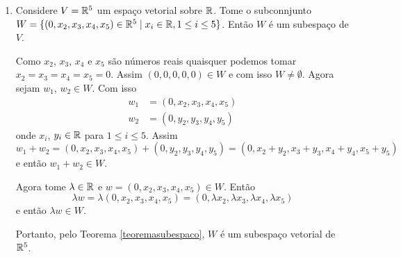\begin{exemplos}
\begin{enumerate}[label={\arabic*})]
\begin{solucao}
			Agora,
			\[
				\lambda u_1 = (\lambda t/4, -13\lambda t/4, \lambda t)
			\]
			e substuindo nas equações de \eqref{exemplosistemahomogeneosubespaco}
			obtemos:
			\begin{align*}
				2\dfrac{\lambda t}{4} + 4\dfrac{-13\lambda t}{8} + 6\lambda t &= \lambda(2\dfrac{t}{8} + 4\dfrac{-13t}{8} + 6t)\\
				3\dfrac{\lambda t}{4} - 2\dfrac{-13\lambda t}{8} - 4\lambda t &= \lambda(3\dfrac{t}{8} - 2\dfrac{-13t}{8} - 4t)\\
				\dfrac{\lambda t}{4} + 2\dfrac{-13\lambda t}{8} + 3\lambda t &= \lambda(\dfrac{t}{8} + 2\dfrac{-13t}{8} + 3t)\\
			\end{align*}
			e como $u_1$ é solução do sistema linear homogêneo \eqref{exemplosistemahomogeneosubespaco} então $\lambda u_1$ é um solução desse sistema, isto é, $\lambda u_1 \in S$. Portanto, pelo Teorema \ref{teoremasubespaco} $S$ é um subespaço vetorial de $\real^3$.
		\end{solucao}
	\item Considere $V = \mathbb{R}^5$ um espaço vetorial sobre $\mathbb{R}$. Tome o subconnjunto $W = \{(0,x_2,x_3,x_4,x_5) \in \mathbb{R}^5 \mid x_i \in \mathbb{R}, 1 \le i \le 5\}$. Então $W$ \'e um subespa\c{c}o de $V$.
		\begin{solucao}
			Como $x_2$, $x_3$, $x_4$ e $x_5$ são números reais quaisquer podemos tomar $x_2 = x_3 = x_4 = x_ 5 = 0$. Assim $(0, 0, 0, 0, 0) \in W$ e com isso $W \ne \emptyset$. Agora sejam $w_1$, $w_2 \in W$. Com isso
			\begin{align*}
				w_1 &= (0,x_2, x_3, x_4, x_5)\\
				w_2 &= (0,y_2, y_3, y_4, y_5)
			\end{align*}
			onde $x_i$, $y_i \in \mathbb{R}$ para $1 \le i \le 5$. Assim
			\[
				w_1 + w_2 = (0,x_2, x_3, x_4, x_5) + (0,y_2, y_3, y_4, y_5) = (0, x_2 + y_2, x_3 + y_3, x_4 + y_4, x_5 + y_5)
			\]
			e então $w_1 + w_2 \in W$.

			Agora tome $\lambda \in \mathbb{R}$ e $w = (0, x_2, x_3, x_4, x_5) \in W$. Então
			\[
				\lambda w = \lambda(0, x_2, x_3, x_4, x_5) = (0, \lambda x_2, \lambda x_3, \lambda x_4, \lambda x_5)
			\]
			e então $\lambda w \in W$. 

			Portanto, pelo Teorema \ref{teoremasubespaco}, $W$ é um subespaço vetorial de $\mathbb{R}^5$.
		\end{solucao}


\end{enumerate}
\end{exemplos}
